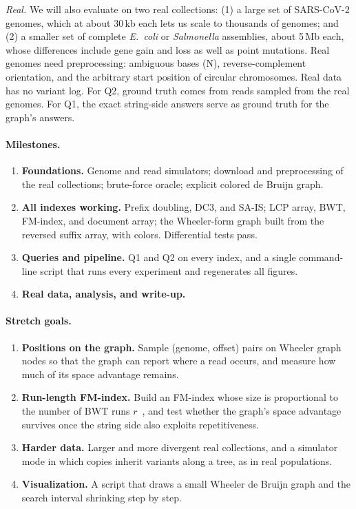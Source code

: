 \documentclass[a4paper,11pt]{article}
\theoremstyle{definition}
\begin{document}
\emph{Real.} We will also evaluate on two real collections: (1) a large set of SARS-CoV-2 genomes, which at about 30\,kb each lets us scale to thousands of genomes; and (2) a smaller set of complete \emph{E.~coli} or \emph{Salmonella} assemblies, about 5\,Mb each, whose differences include gene gain and loss as well as point mutations. Real genomes need preprocessing: ambiguous bases (N), reverse-complement orientation, and the arbitrary start position of circular chromosomes. Real data has no variant log. For Q2, ground truth comes from reads sampled from the real genomes. For Q1, the exact string-side answers serve as ground truth for the graph's answers.

\paragraph{Milestones.}
\begin{enumerate}[itemsep=1pt]
\item \textbf{Foundations.} Genome and read simulators; download and preprocessing of the real collections; brute-force oracle; explicit colored de Bruijn graph.
\item \textbf{All indexes working.} Prefix doubling, DC3, and SA-IS; LCP array, BWT, FM-index, and document array; the Wheeler-form graph built from the reversed suffix array, with colors. Differential tests pass.
\item \textbf{Queries and pipeline.} Q1 and Q2 on every index, and a single command-line script that runs every experiment and regenerates all figures.
\item \textbf{Real data, analysis, and write-up.}
\end{enumerate}

\paragraph{Stretch goals.}
\begin{enumerate}[itemsep=1pt]
\item \textbf{Positions on the graph.} Sample (genome, offset) pairs on Wheeler graph nodes so that the graph can report where a read occurs, and measure how much of its space advantage remains.
\item \textbf{Run-length FM-index.} Build an FM-index whose size is proportional to the number of BWT runs $r$~\cite{10.1145/3375890}, and test whether the graph's space advantage survives once the string side also exploits repetitiveness.
\item \textbf{Harder data.} Larger and more divergent real collections, and a simulator mode in which copies inherit variants along a tree, as in real populations.
\item \textbf{Visualization.} A script that draws a small Wheeler de Bruijn graph and the search interval shrinking step by step.
\end{enumerate}
\end{document}
